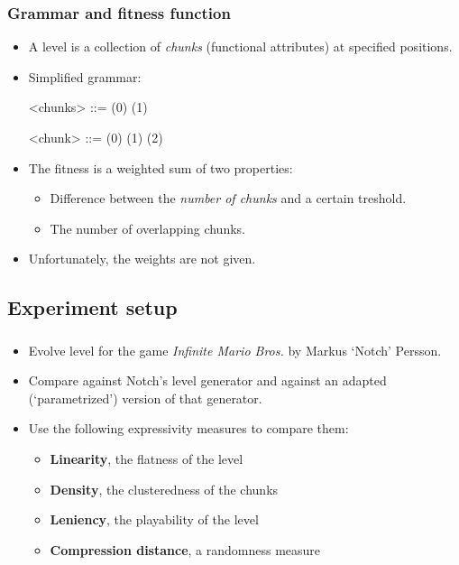 \documentclass{beamer}
\makeatletter
\newcommand*{\currentname}{\@currentlabelname}
\makeatother
\begin{document}
\begin{frame}
\frametitle{Grammar and fitness function}
\begin{itemize}
\item A level is a collection of \textit{chunks} (functional attributes) at specified positions.
\item Simplified grammar:
\vspace{1em}\begin{grammar}
<chunks> ::=  \hfill (0) \hspace{1em}
        \alt {}  \hfill (1) \hspace{1em}
        
<chunk>  ::= \lit*{,}\lit*{,}\lit*{)} \hfill (0) \hspace{1em}
        \alt {}\lit*{,}\lit*{,}\lit*{)} \hfill (1) \hspace{1em}
        \alt {}\lit*{,}\lit*{,}\lit*{)} \hfill (2) \hspace{1em}
        \alt [...]
\end{grammar}\vspace{1em}
\item The fitness is a weighted sum of two properties:
\begin{itemize}
	\item Difference between the \textit{number of chunks} and a certain treshold.
	\item The number of overlapping chunks.
\end{itemize}
\item Unfortunately, the weights are not given.
\end{itemize}
\end{frame}

\subsection{Experiment setup}
\begin{frame}
\frametitle{\currentname}

\begin{itemize}
\item Evolve level for the game \textit{Infinite Mario Bros.} by Markus `Notch' Persson.
\item Compare against Notch's level generator and against an adapted (`parametrized') version of that generator.
\item Use the following expressivity measures to compare them:
\begin{itemize}
\item \textbf{Linearity}, the flatness of the level
\item \textbf{Density}, the clusteredness of the chunks
\item \textbf{Leniency}, the playability of the level
\item \textbf{Compression distance}, a randomness measure
\end{itemize}
\end{itemize}
\end{frame}
\end{document}
